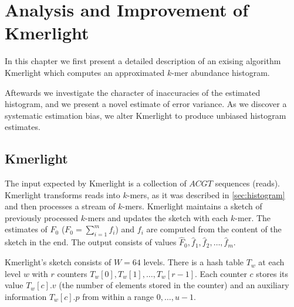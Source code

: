\chapter{Analysis and Improvement of Kmerlight}
\label{sec:chapter2}
In this chapter we first present a detailed description of an exising algorithm
Kmerlight \cite{Sivadasan2016} which computes an approximated $k$-mer abundance histogram.

Aftewards we investigate the character of inaccuracies of the estimated histogram, and we present
a novel estimate of error variance. As we discover a systematic estimation bias, we alter
Kmerlight to produce unbiased histogram estimates. 

\section{Kmerlight}
\label{sec:kmerlight}
The input expected by Kmerlight is a collection of $ACGT$ sequences (reads).
Kmerlight transforms reads into $k$-mers, as it was described in \ref{sec:histogram}
and then processes a stream of $k$-mers. Kmerlight maintains a sketch of previously
processed $k$-mers and updates the sketch with each $k$-mer. The estimates 
of $F_0$ ($F_0 = \sum_{i=1}^{m} f_i$) and $f_i$ are computed from the content of
the sketch in the end. The output consists of values $\hat F_0, \hat f_1, 
\hat f_2, \dots, \hat f_m$.

Kmerlight's sketch consists of $W=64$ levels. There is a hash table $T_w$ at each level 
$w$ with $r$ counters $T_w[0], T_w[1], \dots, T_w[r-1]$.
Each counter $c$ stores its value $T_w[c].v$ (the number of elements stored in the counter)
and an auxiliary information $T_w[c].p$ from within a range $0, \dots, u-1$.


